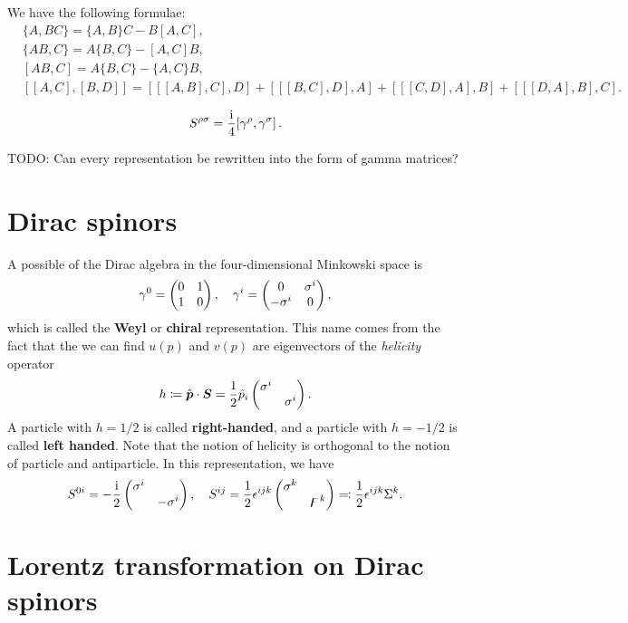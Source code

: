 \documentclass[hyperref, a4paper]{article}
\newcommand*{\ii}{\mathrm{i}}
\newcommand*{\concept}[1]{{\textbf{#1}}}
\begin{document}
\begin{note*}{}{}
    We have the following formulae:
    \[
        \begin{aligned}
            &\{A,BC\}=\{A,B\}C-B[A,C], \\ 
            &\{AB,C\}=A\{B,C\}-[A,C]B, \\ 
            &[AB,C]=A\{B,C\}-\{A,C\}B, \\
            &[[A,C],[B,D]]=[[[A,B],C],D]+[[[B,C],D],A]+[[[C,D],A],B]+[[[D,A],B],C].
        \end{aligned}
    \]
\end{note*}

\begin{equation}
    S^{\rho \sigma} = \frac{\ii}{4} \comm*{\gamma^\rho}{\gamma^\sigma}.
\end{equation}

TODO: Can every representation be rewritten into the form of gamma matrices?

\section{Dirac spinors}

A possible of the Dirac algebra in the four-dimensional Minkowski space is
\begin{equation}
    \gamma^0 = \pmqty{0 & 1 \\ 1 & 0}, \quad \gamma^i = \pmqty{ 0 & \sigma^i \\ - \sigma^i & 0 },
\end{equation}
which is called the \concept{Weyl} or \concept{chiral} representation. This name comes from the fact that the 
we can find $u(p)$ and $v(p)$ are eigenvectors of the \emph{helicity} operator 
\begin{equation}
    h \coloneqq \hat{\vb*{p}} \cdot \vb*{S} = \frac{1}{2} \hat{p}_i \pmqty{\dmat{\sigma^i, \sigma^i}}.
\end{equation}
A particle with $h = 1/2$ is called \concept{right-handed}, and a particle with $h = - 1/2$ is called 
\concept{left handed}. Note that the notion of helicity is orthogonal to the notion of particle and antiparticle.
In this representation, we have 
\begin{equation}
    S^{0 i} = - \frac{\ii}{2} \pmqty{\dmat{\sigma^i, - \sigma^i}}, \quad 
    S^{ij} = \frac{1}{2} \epsilon^{ijk} \pmqty{\dmat{\sigma^k, \digamma^k}} \eqqcolon \frac{1}{2} \epsilon^{ijk} \Sigma^k.
    \label{eq:weyl-lorentz}
\end{equation}

\section{Lorentz transformation on Dirac spinors}
\end{document}
